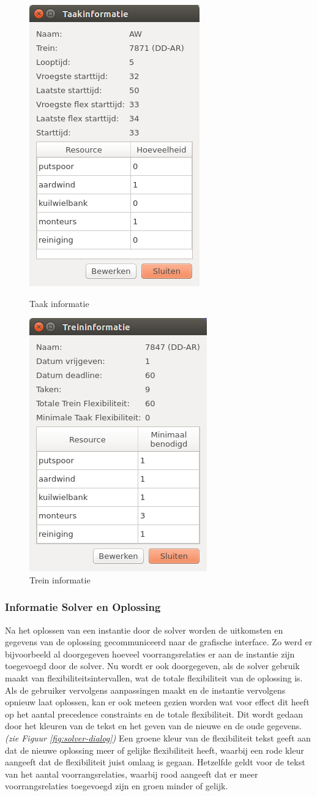 \begin{figure}[H]
\parbox{.45\linewidth}{
    \center
    \includegraphics[width=.4\textwidth]{../images/taak-info.png}
    \caption{Taak informatie}
    \label{fig:taak-info}
}\hfill
\parbox{.45\linewidth}{
    \center
    \includegraphics[width=.4\textwidth]{../images/trein-info.png}
    \caption{Trein informatie}
    \label{fig:trein-info}
}
\end{figure}

\subsubsection{Informatie Solver en Oplossing}
Na het oplossen van een instantie door de solver worden de uitkomsten en gegevens van de oplossing gecommuniceerd naar de grafische interface. Zo werd er bijvoorbeeld al doorgegeven hoeveel voorrangsrelaties er aan de instantie zijn toegevoegd door de solver. Nu wordt er ook doorgegeven, als de solver gebruik maakt van flexibiliteitsintervallen, wat de totale flexibiliteit van de oplossing is. Als de gebruiker vervolgens aanpassingen maakt en de instantie vervolgens opnieuw laat oplossen, kan er ook meteen gezien worden wat voor effect dit heeft op het aantal precedence constraints en de totale flexibiliteit. Dit wordt gedaan door het kleuren van de tekst en het geven van de nieuwe en de oude gegevens. \emph{(zie Figuur \ref{fig:solver-dialog})} Een groene kleur van de flexibiliteit tekst geeft aan dat de nieuwe oplossing meer of gelijke flexibiliteit heeft, waarbij een rode kleur aangeeft dat de flexibiliteit juist omlaag is gegaan. Hetzelfde geldt voor de tekst van het aantal voorrangsrelaties, waarbij rood aangeeft dat er meer voorrangsrelaties toegevoegd zijn en groen minder of gelijk.

